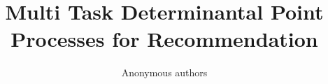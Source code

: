 \documentclass[letterpaper]{article} %
\begin{document}
\title{Multi Task Determinantal Point Processes for Recommendation}
\author{Anonymous authors
}
\maketitle



\maketitle







 
\end{document}
